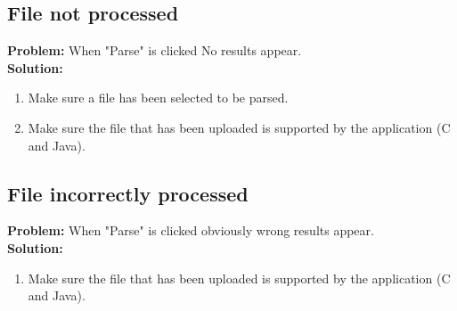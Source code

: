 \documentclass[11pt]{article}
\begin{document}
\subsection{File not processed}
\textbf{Problem:} When "Parse" is clicked No results appear. \\
\textbf{Solution: } \begin{enumerate}
\item Make sure a file has been selected to be parsed.
\item Make sure the file that has been uploaded is supported by the application (C and Java).
\end{enumerate} 

\subsection{File incorrectly processed}
\textbf{Problem:} When "Parse" is clicked obviously wrong results appear. \\
\textbf{Solution: } \begin{enumerate}
\item Make sure the file that has been uploaded is supported by the application (C and Java).
\end{enumerate} 
\end{document}

